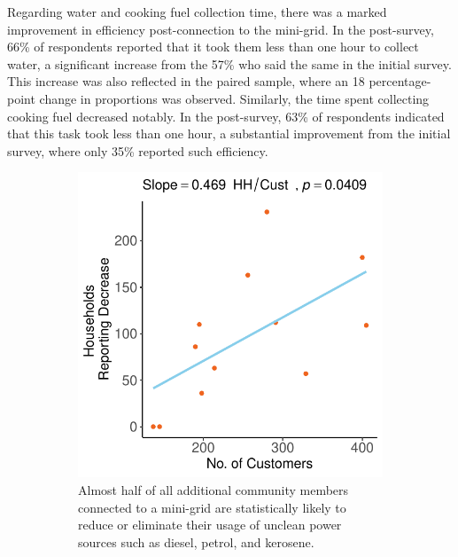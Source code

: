 Regarding water and cooking fuel collection time, there was a marked improvement in efficiency post-connection to the mini-grid. In the post-survey, 66\% of respondents reported that it took them less than one hour to collect water, a significant increase from the 57\% who said the same in the initial survey. This increase was also reflected in the paired sample, where an 18 percentage-point change in proportions was observed. Similarly, the time spent collecting cooking fuel decreased notably. In the post-survey, 63\% of respondents indicated that this task took less than one hour, a substantial improvement from the initial survey, where only 35\% reported such efficiency.

\begin{figure}[th]
    \centering
    \begin{subfigure}[t]{0.48\textwidth}
        \centering
        \includegraphics[width=\textwidth]{images/power_sources_unclean_regression_community.pdf}
        \caption{Almost half of all additional community members connected to a mini-grid are statistically likely to reduce or eliminate their usage of unclean power sources such as diesel, petrol, and kerosene.}
        \label{fig:unclean_power_usage}
    \end{subfigure}
    \hfill
    \begin{subfigure}[t]{0.48\textwidth}

\end{subfigure}
\end{figure}

